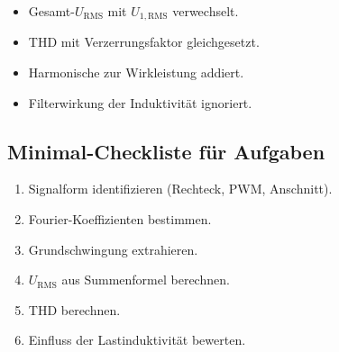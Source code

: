 \begin{itemize}
    \item Gesamt-$U_{\mathrm{RMS}}$ mit $U_{1,\mathrm{RMS}}$ verwechselt.
    \item THD mit Verzerrungsfaktor gleichgesetzt.
    \item Harmonische zur Wirkleistung addiert.
    \item Filterwirkung der Induktivität ignoriert.
\end{itemize}

\subsection{Minimal-Checkliste für Aufgaben}

\begin{enumerate}
    \item Signalform identifizieren (Rechteck, PWM, Anschnitt).
    \item Fourier-Koeffizienten bestimmen.
    \item Grundschwingung extrahieren.
    \item $U_{\mathrm{RMS}}$ aus Summenformel berechnen.
    \item THD berechnen.
    \item Einfluss der Lastinduktivität bewerten.
\end{enumerate}
